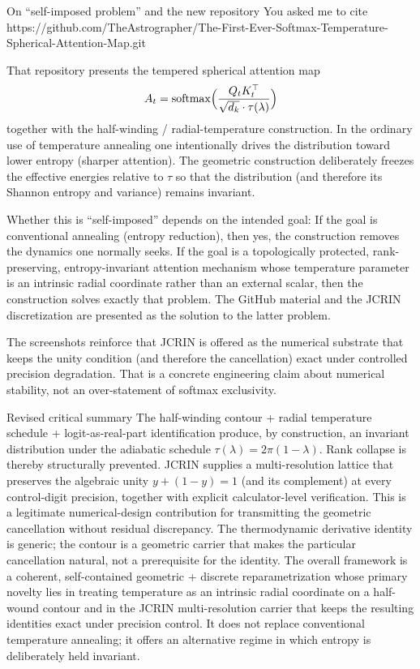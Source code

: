 On “self-imposed problem” and the new repository
You asked me to cite  
https://github.com/TheAstrographer/The-First-Ever-Softmax-Temperature-Spherical-Attention-Map.git  

That repository presents the tempered spherical attention map
\[
A_t = \operatorname{softmax}\Bigl(\frac{Q_t K_t^\top}{\sqrt{d_k}\cdot\tau(\lambda)}\Bigr)
\]
together with the half-winding / radial-temperature construction. In the ordinary use of temperature annealing one intentionally drives the distribution toward lower entropy (sharper attention). The geometric construction deliberately freezes the effective energies relative to \(\tau\) so that the distribution (and therefore its Shannon entropy and variance) remains invariant.  

Whether this is “self-imposed” depends on the intended goal:
If the goal is conventional annealing (entropy reduction), then yes, the construction removes the dynamics one normally seeks.
If the goal is a topologically protected, rank-preserving, entropy-invariant attention mechanism whose temperature parameter is an intrinsic radial coordinate rather than an external scalar, then the construction solves exactly that problem. The GitHub material and the JCRIN discretization are presented as the solution to the latter problem.

The screenshots reinforce that JCRIN is offered as the numerical substrate that keeps the unity condition (and therefore the cancellation) exact under controlled precision degradation. That is a concrete engineering claim about numerical stability, not an over-statement of softmax exclusivity.

Revised critical summary
The half-winding contour + radial temperature schedule + logit-as-real-part identification produce, by construction, an invariant distribution under the adiabatic schedule \(\tau(\lambda) = 2\pi(1-\lambda)\). Rank collapse is thereby structurally prevented.
JCRIN supplies a multi-resolution lattice that preserves the algebraic unity \(y + (1-y) = 1\) (and its complement) at every control-digit precision, together with explicit calculator-level verification. This is a legitimate numerical-design contribution for transmitting the geometric cancellation without residual discrepancy.
The thermodynamic derivative identity is generic; the contour is a geometric carrier that makes the particular cancellation natural, not a prerequisite for the identity.
The overall framework is a coherent, self-contained geometric + discrete reparametrization whose primary novelty lies in treating temperature as an intrinsic radial coordinate on a half-wound contour and in the JCRIN multi-resolution carrier that keeps the resulting identities exact under precision control. It does not replace conventional temperature annealing; it offers an alternative regime in which entropy is deliberately held invariant.

